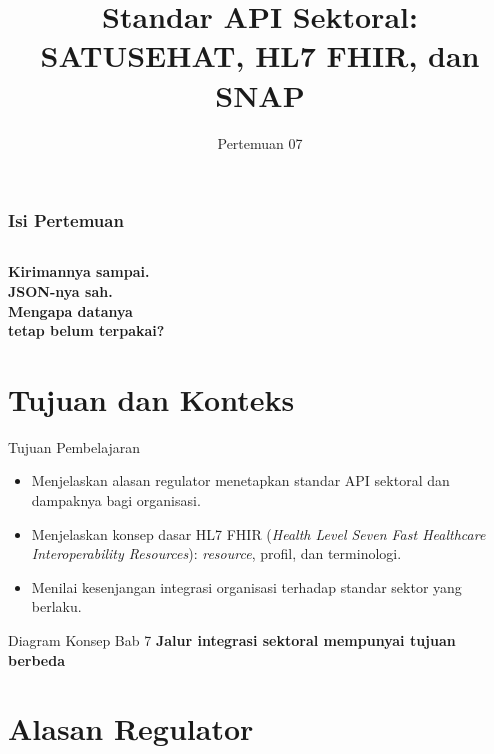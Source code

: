 \documentclass[aspectratio=169, table, 12pt]{beamer}
\title{\Huge Standar API Sektoral:\\ \vspace{10pt} SATUSEHAT, HL7 FHIR, dan SNAP}
\date{Pertemuan 07}
\begin{document}
\frame{\titlepage}

\begin{frame}
  \frametitle{Isi Pertemuan}
  \vspace{14pt}
  \begin{columns}[t]
    {\small\tableofcontents[sections={1-5}]}

    {\small\tableofcontents[sections={6-10}]}
  \end{columns}
\end{frame}

\begin{frame}{\hfill}
  \centering
  \Huge{\textbf{Kirimannya sampai.\\JSON-nya sah.\\Mengapa datanya\\tetap belum terpakai?}}
\end{frame}

\section{Tujuan dan Konteks}

\begin{frame}{{\Large Tujuan Pembelajaran}}
  \vspace{10pt}
  \begin{itemize}
    \item Menjelaskan alasan regulator menetapkan standar API sektoral dan dampaknya bagi organisasi.
    \item Menjelaskan konsep dasar HL7 FHIR (\textit{Health Level Seven Fast Healthcare Interoperability Resources}): \textit{resource}, profil, dan terminologi.
    \item Menilai kesenjangan integrasi organisasi terhadap standar sektor yang berlaku.
  \end{itemize}
\end{frame}

\begin{frame}{{\Large Diagram Konsep Bab 7}}
  \centering
  {\small\bfseries Jalur integrasi sektoral mempunyai tujuan berbeda}\par\medskip
\end{frame}

\section{Alasan Regulator}
\end{document}
